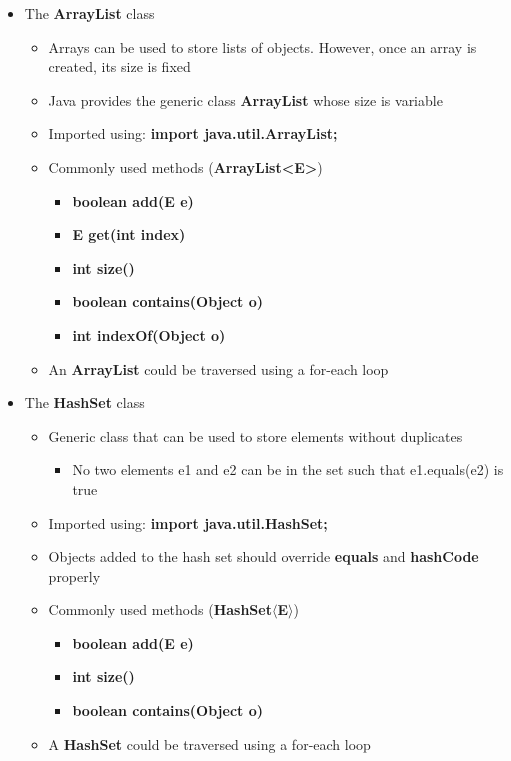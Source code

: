 \begin{itemize}
\begin{itemize}
\begin{itemize}
		\end{itemize}
		\item The \textbf{ArrayList} class
		\begin{itemize}
			\item Arrays can be used to store lists of objects. However, once an
			array is created, its size is fixed
			\item Java provides the generic class \textbf{ArrayList} whose size is variable
			\item Imported using: \textbf{import java.util.ArrayList;}
			\item Commonly used methods (\textbf{ArrayList<E>})
			\begin{itemize}
				\item \textbf{boolean add(E e)}
				\item \textbf{E get(int index)}
				\item \textbf{int size()}
				\item \textbf{boolean contains(Object o)}
				\item \textbf{int indexOf(Object o)}
			\end{itemize}
			\item An \textbf{ArrayList} could be traversed using a for-each loop
		\end{itemize}
		\item The \textbf{HashSet} class
		\begin{itemize}
			\item Generic class that can be used to store elements without duplicates
			\begin{itemize}
				\item No two elements e1 and e2 can be in the set such that e1.equals(e2) is true
			\end{itemize}
			\item Imported using: \textbf{import java.util.HashSet;}
			\item Objects added to the hash set should override \textbf{equals} and \textbf{hashCode} properly
			\item Commonly used methods (\textbf{HashSet$\langle$E$\rangle$})
			\begin{itemize}
				\item \textbf{boolean add(E e)}
				\item \textbf{int size()}
				\item \textbf{boolean contains(Object o)}
			\end{itemize}
			\item A \textbf{HashSet} could be traversed using a for-each loop
		\end{itemize}


\end{itemize}
\end{itemize}
